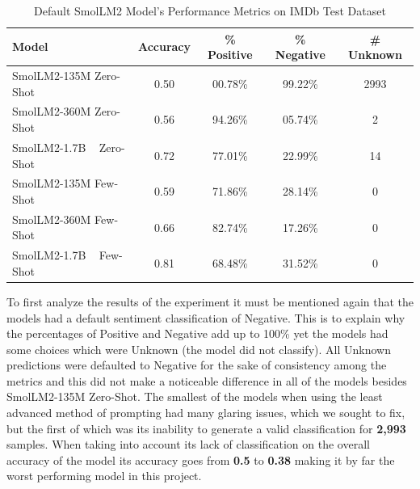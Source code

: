 \documentclass[10pt,twocolumn,letterpaper]{article}
\begin{document}


\begin{table}[ht]
\centering
\begin{tabular}{|l|c|c|c|c|}
\hline
\textbf{Model} & \textbf{Accuracy} & \textbf{\% Positive} & \textbf{\% Negative} & \textbf{\# Unknown} \\ 
\hline\hline
SmolLM2-135M Zero-Shot   & 0.50 & 00.78\%  & 99.22\% & 2993 \\ 
SmolLM2-360M Zero-Shot   & 0.56 & 94.26\%  & 05.74\% & 2    \\ 
SmolLM2-1.7B ~ Zero-Shot   & 0.72 & 77.01\%  & 22.99\% & 14   \\ 
SmolLM2-135M Few-Shot    & 0.59 & 71.86\%  & 28.14\% & 0    \\ 
SmolLM2-360M Few-Shot    & 0.66 & 82.74\%  & 17.26\% & 0    \\ 
SmolLM2-1.7B ~ Few-Shot    & 0.81 & 68.48\%  & 31.52\% & 0    \\ 
\hline
\end{tabular}
\caption{Default SmolLM2 Model's Performance Metrics on IMDb Test Dataset}
\label{tab:default-SmolLM2-metrics}
\end{table}

To first analyze the results of the experiment it must be mentioned again that the models had a default sentiment classification of Negative. This is to explain why the percentages of Positive and Negative add up to 100\% yet the models had some choices which were Unknown (the model did not classify). All Unknown predictions were defaulted to Negative for the sake of consistency among the metrics and this did not make a noticeable difference in all of the models besides SmolLM2-135M Zero-Shot. The smallest of the models when using the least advanced method of prompting had many glaring issues, which we sought to fix, but the first of which was its inability to generate a valid classification for \textbf{2,993} samples. When taking into account its lack of classification on the overall accuracy of the model its accuracy goes from \textbf{0.5} to \textbf{0.38} making it by far the worst performing model in this project. 
\end{document}
